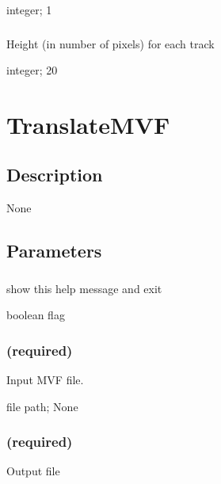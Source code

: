 \documentclass[letterpaper,11pt,english]{sphinxmanual}
\begin{document}
 integer;  1


\subsubsection{}
\label{\detokenize{prog_desc:yscale}}
 Height (in number of pixels) for each track

 integer;  20


\section{TranslateMVF}
\label{\detokenize{prog_desc:translatemvf}}

\subsection{Description}
\label{\detokenize{prog_desc:id137}}
None


\subsection{Parameters}
\label{\detokenize{prog_desc:id138}}

\subsubsection{}
\label{\detokenize{prog_desc:id139}}
 show this help message and exit

 boolean flag


\subsubsection{ (required)}
\label{\detokenize{prog_desc:id140}}
 Input MVF file.

 file path;  None


\subsubsection{ (required)}
\label{\detokenize{prog_desc:id141}}
 Output file
\end{document}
